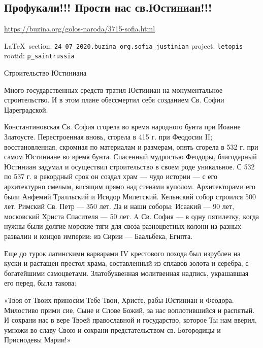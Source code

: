  
 
\subsection{Профукали!!! Прости нас св.Юстиниан!!!}
\url{https://buzina.org/golos-naroda/3715-sofia.html}
  
\vspace{0.5cm}
 {\ifDEBUG\small\LaTeX~section: \verb|24_07_2020.buzina_org.sofia_justinian| project: \verb|letopis| rootid: \verb|p_saintrussia| \fi}
\vspace{0.5cm}


Строительство Юстиниана

Много государственных средств тратил Юстиниан на монументальное строительство.
И в этом плане обессмертил себя созданием Св. Софии Цареградской.

Константиновская Св. София сгорела во время народного бунта при Иоанне
Златоусте. Перестроенная вновь, сгорела в 415 г. при Феодосии II;
восстановленная, скромная по материалам и размерам, опять сгорела в 532 г. при
самом Юстиниане во время бунта. Спасенный мудростью Феодоры, благодарный
Юстиниан задумал и осуществил строительство в своем роде уникальное. С 532 по
537 г. в рекордный срок он создал храм --- чудо истории --- с его архитектурно
смелым, висящим прямо над стенами куполом. Архитекторами его были Анфемий
Тралльский и Исидор Милетский. Кельнский собор строился 500 лет. Римский Св.
Петр --- 350 лет. Да и наши соборы: Исаакий --- 90 лет, московский Христа Спасителя
--- 50 лет. A Св. София --- в одну пятилетку, когда нужны были долгие морские тяги
для своза разноцветных колонн из разных развалин и концов империи: из Сирии ---
Баальбека, Египта.

Еще до турок латинскими варварами IV крестового похода был изрублен на куски и
растащен престол храма, составленный из сплавов золота и серебра, с богатейшими
самоцветами. Златобуквенная молитвенная надпись, украшавшая его перед, была
такова:

«Твоя от Твоих приносим Тебе Твои, Христе, рабы Юстиниан и Феодора. Милостиво
прими сие, Сыне и Слове Божий, за нас воплотившийся и распятый. И сохрани нас в
вере Твоей православной и государство, которое Ты нам вверил, умножи во славу
Свою и сохрани предстательством св. Богородицы и Приснодевы Марии!»


